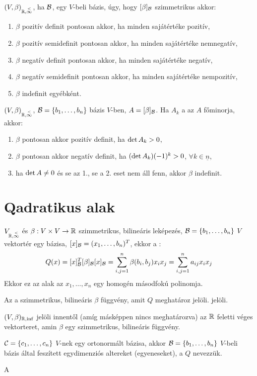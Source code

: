 \documentclass{article}
\DeclarePairedDelimiter{\hz}{\{}{\}}
\begin{document}
	\begin{all}
		$(V,\beta)_{\mathbb{R},\overset{<}{\infty}}$, ha $\mathcal{B}$, egy $V$-beli bázis, úgy, hogy $[\beta]_{\mathcal{B}}$ 
		szimmetrikus akkor:
		\begin{enumerate}
			\item $\beta$ pozitív definit pontosan akkor, ha minden sajátértéke
				pozitív,
			\item $\beta$ pozitív semidefinit pontosan akkor, ha minden
				sajátértéke nemnegatív,
			\item $\beta$ negatív definit pontosan akkor, ha minden sajátértéke
				negatív,
			\item $\beta$ negatív semidefinit pontosan akkor, ha minden
				sajátértéke nempozitív,
			\item $\beta$ indefinit egyébként.
		\end{enumerate}
	\end{all}
	\begin{all}
		$(V,\beta)_{\mathbb{R},\overset{<}{\infty}}$, $\B=\hz{b_1,\ldots,b_n}$ bázis $V$-ben,
		$A=[\beta]_{\mathcal{B}}$. Ha $A_k$ a az $A$ főminorja, akkor:
		\begin{enumerate}
		\item $\beta$ pontosan akkor pozitív definit, ha $\operatorname{det}{A_k}>0$,
		\item $\beta$ pontosan akkor negatív definit, ha $(\operatorname{det}{A_k})(-1)^k>0$,
			$\forall k\in\underline{n}$,
		\item ha $\operatorname{det}{A}\neq 0$ és se az 1., se a 2. eset nem áll fenn, akkor
			$\beta$ indefinit.
		\end{enumerate}
	\end{all}

	\section{Qadratikus alak}
	\begin{ff}
		$V_{\mathbb{R},\overset{<}{\infty}}$ és $\beta:V\times V\to \mathbb{R}$ szimmetrikus, bilineáris leképezés,
		$\B=\hz{b_1,\ldots,b_n}$ $V$ vektortér egy bázisa,
		$[x]_{\mathcal{B}}=(x_1,\ldots,b_n)^T$, ekkor a :
		\begin{equation*}
			Q(x)=[x]_{\mathcal{B}}^T[\beta]_{\mathcal{B}}[x]_{\mathcal{B}}=\sum_{i,j=1}^n\beta(b_i,b_j)x_ix_j=\sum_{i,j=1}^n
			a_{ij}x_ix_j
		\end{equation*}
		Ekkor ez az alak az $x_1,\ldots,x_n$ egy homogén másodfokú polinomja.
	\end{ff}
	\begin{jel}
		Az a szimmetrikus, bilineáris $\beta$ függvény, amit $Q$ meghatároz
		 jelöli.
		jelöli.
	\end{jel}
	\begin{jel}
		$(V,\beta)_{\mathbb{R},\inf}$ jelöli innentől (amíg másképpen nincs
		meghatározva) az $\mathbb{R}$ feletti véges vektorteret, amin $\beta$ egy szimmetrikus,
		bilineáris függvény.
	\end{jel}
	\begin{ff}
		 $\mathcal{C}=\hz{c_1,\dots,c_n}$ $V$-nek egy ortonormált
		bázisa, akkor $\B=\hz{b_1,\ldots,b_n}$ $V$-beli bázis által feszített
		egydimenziós altereket (egyeneseket), a $Q$  nevezzük.
	\end{ff}
	\begin{ff}
		A 
	\end{ff}
\end{document}
